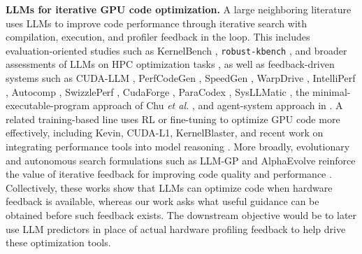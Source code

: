 \textbf{LLMs for iterative GPU code optimization.}
A large neighboring literature uses LLMs to improve code performance through iterative search with compilation, execution, and profiler feedback in the loop.
This includes evaluation-oriented studies such as KernelBench \cite{ouyangKernelBenchCanLLMs2025}, \texttt{robust-kbench} \cite{langeRobustAgenticCUDA2025}, and broader assessments of LLMs on HPC optimization tasks \cite{bowencuiLargeLanguageModels2025,cuiComprehensiveEvaluationLLMs2025}, as well as feedback-driven systems such as CUDA-LLM \cite{chenCUDALLMLLMsCan2025}, PerfCodeGen \cite{pengPerfCodeGenImprovingPerformance2025}, SpeedGen \cite{purschkeSpeedGenEnhancingCode2025}, WarpDrive \cite{damaniWarpDriveAgenticWorkflow}, IntelliPerf \cite{awadIntelliPerfLLMPoweredAutonomous2025}, Autocomp \cite{hongAutocompPowerfulPortable2025}, SwizzlePerf \cite{tschandSwizzlePerfHardwareAwareLLMs2025}, CudaForge \cite{zhangCudaForgeAgentFramework2025}, ParaCodex \cite{kaplanParaCodexProfilingGuidedAutonomous2026}, SysLLMatic \cite{pengSysLLMaticLargeLanguage2025}, the minimal-executable-program approach of Chu \textit{et al.} \cite{chuGPUKernelOptimization2025}, and agent-system approach in \cite{weiImprovingParallelProgram2024}.
A related training-based line uses RL or fine-tuning to optimize GPU code more effectively, including Kevin, CUDA-L1, KernelBlaster, and recent work on integrating performance tools into model reasoning \cite{baronioKevinMultiTurnRL2025,liCUDAL1ImprovingCUDA2026,dongKernelBlasterContinualCrossTask2026,nicholsIntegratingPerformanceTools2025}.
More broadly, evolutionary and autonomous search formulations such as LLM-GP and AlphaEvolve reinforce the value of iterative feedback for improving code quality and performance \cite{hembergEvolvingCodeLarge2024,novikovAlphaEvolveCodingAgent2025}.
Collectively, these works show that LLMs can optimize code when hardware feedback is available, whereas our work asks what useful guidance can be obtained before such feedback exists.
The downstream objective would be to later use LLM predictors in place of actual hardware profiling feedback to help drive these optimization tools.

